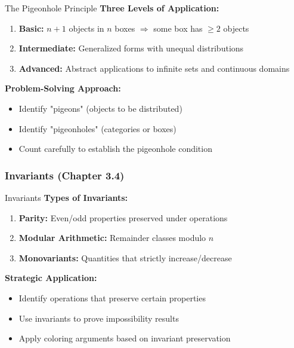 \documentclass[12pt]{article}
\begin{document}
	\begin{tacticsbox}{The Pigeonhole Principle}
		\textbf{Three Levels of Application:}
		\begin{enumerate}
			\item \textbf{Basic:} $n+1$ objects in $n$ boxes $\Rightarrow$ some box has $\geq 2$ objects
			\item \textbf{Intermediate:} Generalized forms with unequal distributions
			\item \textbf{Advanced:} Abstract applications to infinite sets and continuous domains
		\end{enumerate}
		
		\textbf{Problem-Solving Approach:}
		\begin{itemize}
			\item Identify "pigeons" (objects to be distributed)
			\item Identify "pigeonholes" (categories or boxes)
			\item Count carefully to establish the pigeonhole condition
		\end{itemize}
	\end{tacticsbox}
	
	\subsubsection{Invariants (Chapter 3.4)}
	
	\begin{tacticsbox}{Invariants}
		\textbf{Types of Invariants:}
		\begin{enumerate}
			\item \textbf{Parity:} Even/odd properties preserved under operations
			\item \textbf{Modular Arithmetic:} Remainder classes modulo $n$
			\item \textbf{Monovariants:} Quantities that strictly increase/decrease
		\end{enumerate}
		
		\textbf{Strategic Application:}
		\begin{itemize}
			\item Identify operations that preserve certain properties
			\item Use invariants to prove impossibility results
			\item Apply coloring arguments based on invariant preservation
		\end{itemize}
	\end{tacticsbox}
\end{document}
